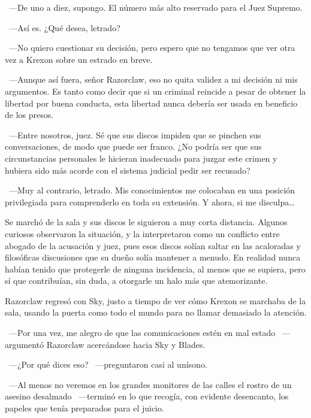 ~---De uno a diez, supongo. El número más alto reservado para el Juez Supremo.

~---Así es. ¿Qué desea, letrado?

~---No quiero cuestionar su decisión, pero espero que no tengamos que ver otra vez a Krexon sobre un estrado en breve.

~---Aunque así fuera, señor Razorclaw, eso no quita validez a mi decisión ni mis argumentos. Es tanto como decir que si un criminal reincide a pesar de obtener la libertad por buena conducta, esta libertad nunca debería ser usada en beneficio de los presos.

~---Entre nosotros, juez. Sé que sus discos impiden que se pinchen sus conversaciones, de modo que puede ser franco. ¿No podría ser que sus circunstancias personales le hicieran inadecuado para juzgar este crimen y hubiera sido más acorde con el sistema judicial pedir ser recusado?

~---Muy al contrario, letrado. Mis conocimientos me colocaban en una posición privilegiada para comprenderlo en toda su extensión. Y ahora, si me disculpa\dots\

Se marchó de la sala y sus discos le siguieron a muy corta distancia. Algunos curiosos observaron la situación, y la interpretaron como un conflicto entre abogado de la acusación y juez, pues esos discos solían saltar en las acaloradas y filosóficas discusiones que su dueño solía mantener a menudo. En realidad nunca habían tenido que protegerle de ninguna incidencia, al menos que se supiera, pero sí que contribuían, sin duda, a otorgarle un halo más que atemorizante.

Razorclaw regresó con Sky, justo a tiempo de ver cómo Krexon se marchaba de la sala, usando la puerta como todo el mundo para no llamar demasiado la atención.

~---Por una vez, me alegro de que las comunicaciones estén en mal estado ~---argumentó Razorclaw acercándose hacia Sky y Blades.

~---¿Por qué dices eso? ~---preguntaron casi al unísono.

~---Al menos no veremos en los grandes monitores de las calles el rostro de un asesino desalmado ~---terminó en lo que recogía, con evidente desencanto, los papeles que tenía preparados para el juicio.

\endinput
